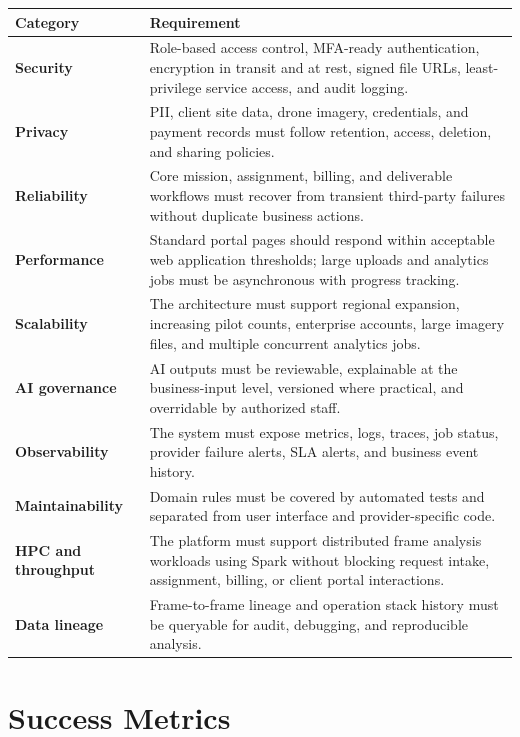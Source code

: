 \documentclass[11pt,a4paper]{article}
\begin{document}
\begin{longtable}{>{\bfseries}p{}p{}}
\toprule
Category & Requirement \\
\midrule
Security & Role-based access control, MFA-ready authentication, encryption in transit and at rest, signed file URLs, least-privilege service access, and audit logging. \\
Privacy & PII, client site data, drone imagery, credentials, and payment records must follow retention, access, deletion, and sharing policies. \\
Reliability & Core mission, assignment, billing, and deliverable workflows must recover from transient third-party failures without duplicate business actions. \\
Performance & Standard portal pages should respond within acceptable web application thresholds; large uploads and analytics jobs must be asynchronous with progress tracking. \\
Scalability & The architecture must support regional expansion, increasing pilot counts, enterprise accounts, large imagery files, and multiple concurrent analytics jobs. \\
AI governance & AI outputs must be reviewable, explainable at the business-input level, versioned where practical, and overridable by authorized staff. \\
Observability & The system must expose metrics, logs, traces, job status, provider failure alerts, SLA alerts, and business event history. \\
Maintainability & Domain rules must be covered by automated tests and separated from user interface and provider-specific code. \\
HPC and throughput & The platform must support distributed frame analysis workloads using Spark without blocking request intake, assignment, billing, or client portal interactions. \\
Data lineage & Frame-to-frame lineage and operation stack history must be queryable for audit, debugging, and reproducible analysis. \\
\bottomrule
\end{longtable}

\section{Success Metrics}
\end{document}
